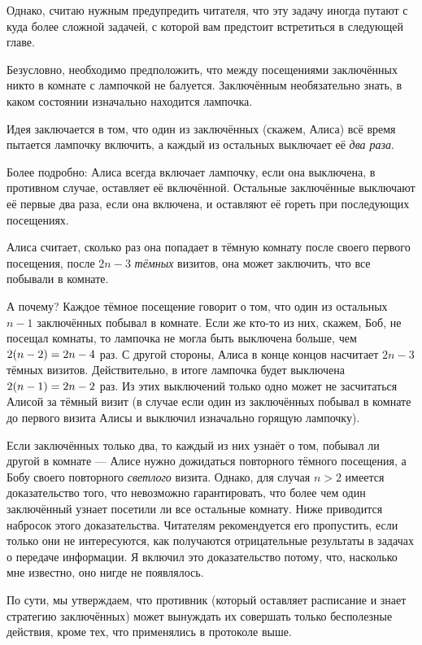 Однако, считаю нужным предупредить читателя, что эту задачу иногда путают с куда более сложной задачей, с которой вам предстоит встретиться в следующей главе.

\medskip

Безусловно, необходимо предположить, что между посещениями заключённых никто в комнате с лампочкой не балуется.
Заключённым необязательно знать, в каком состоянии изначально находится лампочка.

{

\sloppy

Идея заключается в том, что один из заключённых (скажем, Алиса) всё время пытается лампочку включить, а каждый из остальных выключает её \emph{два раза}.

}

Более подробно: Алиса всегда включает лампочку, если она выключена, в противном случае, оставляет её включённой.
Остальные заключённые выключают её первые два раза, если она включена, и оставляют её гореть при последующих посещениях.

Алиса считает, сколько раз она попадает в тёмную комнату после своего первого 
посещения, после $2n-3$ \emph{тёмных} визитов, она может заключить, что все побывали в комнате.

А почему?
Каждое тёмное посещение говорит о том, что один из остальных $n-1$ заключённых побывал в комнате.
Если же кто-то из них, скажем, Боб, не посещал комнаты, то лампочка не могла быть выключена больше, чем $2(n-2)\z=2n-4$ раз.
С другой стороны, Алиса в конце концов насчитает $2n-3$ тёмных визитов.
Действительно, в итоге лампочка будет выключена $2(n-1)\z=2n-2$
раз.
Из этих выключений только одно может не засчитаться Алисой за тёмный визит (в случае если один из заключённых побывал в комнате до первого визита Алисы и выключил изначально горящую лампочку).

Если заключённых только два, то каждый из них узнаёт о том, побывал ли другой в комнате ---
Алисе нужно дожидаться повторного тёмного посещения, а Бобу своего повторного \emph{светлого} визита.
Однако, для случая $n>2$ имеется доказательство того, что невозможно гарантировать, что более чем один заключённый узнает посетили ли все остальные комнату.
Ниже приводится набросок этого доказательства.
Читателям рекомендуется его пропустить, если только они не интересуются, как получаются отрицательные результаты в задачах о передаче информации.
Я включил это доказательство потому, что, насколько мне известно, оно нигде не появлялось.

По сути, мы утверждаем, что противник (который оставляет расписание и знает стратегию заключённых) может вынуждать их совершать только бесполезные действия, кроме тех, что применялись в протоколе выше.


